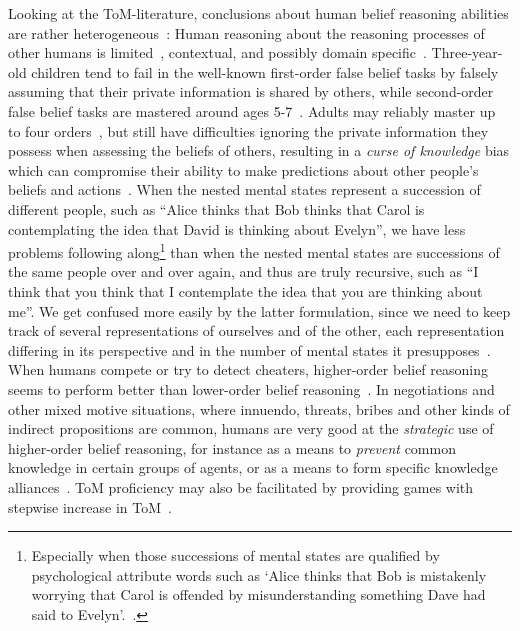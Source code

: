 Looking at the ToM-literature, conclusions about human belief reasoning abilities are rather heterogeneous~\cite{apperly2009humans, saxe2013theory}: Human reasoning about the reasoning processes of other humans is limited~\cite{premack1978does, gopnik1988children, stahl1995players, nagel1995unraveling, hedden2002you, keysar2003limits, pinker2003language}, contextual, and possibly domain specific~\cite{leslie1992domain, saxe2009theory, heyes2014submentalizing}. Three-year-old children tend to fail in the well-known first-order false belief tasks by falsely assuming that their private information is shared by others, while second-order false belief tasks are mastered around ages 5-7~\cite{perner1985john, sullivan1994preschoolers}. Adults may reliably master up to four orders~\cite{kinderman1998theory}, but still have difficulties ignoring the private information they possess when assessing the beliefs of others, resulting in a \textit{curse of knowledge} bias which can compromise their ability to make predictions about other people’s beliefs and actions~\cite{camerer1989curse, birch2007curse}. When the nested mental states represent a succession of different people, such as ``Alice thinks that Bob thinks that Carol is contemplating the idea that David is thinking about Evelyn'', we have less problems following along\footnote{Especially when those successions of mental states are qualified by psychological attribute words such as `Alice thinks that Bob is mistakenly worrying that Carol is offended by misunderstanding something Dave had said to Evelyn'.~\cite{academian2019unrolling}.
} than when the nested mental states are successions of the same people over and over again, and thus are truly recursive, such as ``I think that you think that I contemplate the idea that you are thinking about me''. We get confused more easily by the latter formulation, since we need to keep track of several representations of ourselves and of the other, each representation differing in its perspective and in the number of mental states it presupposes~\cite{de2019common}. When humans compete or try to detect cheaters, higher-order belief reasoning seems to perform better than lower-order belief reasoning~\cite{goodie2012levels}. In negotiations and other mixed motive situations, where innuendo, threats, bribes and other kinds of indirect propositions are common, humans are very good at the \textit{strategic} use of higher-order belief reasoning, for instance as a means to \emph{prevent} common knowledge in certain groups of agents, or as a means to form specific knowledge alliances~\cite{pinker2007stuff, pinker2008logic, de2017negotiating}. ToM proficiency may also be facilitated by providing games with stepwise increase in ToM~\cite{verbrugge2018stepwise}.

